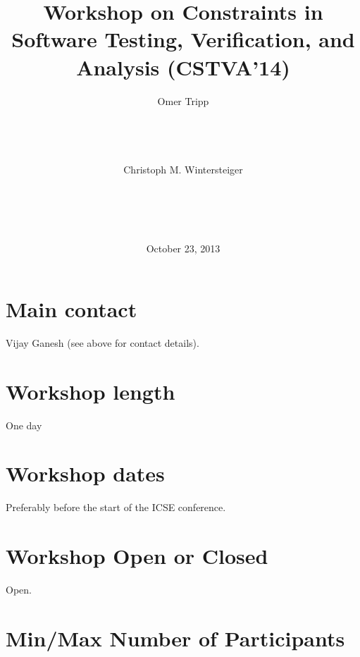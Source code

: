 \documentclass{sig-alternate}
\begin{document}
\title{Workshop on Constraints in Software Testing, Verification, and
  Analysis (CSTVA'14)}


\author{
\alignauthor
Omer Tripp\\
       \\
       \\
       \\
       \\
\alignauthor
Christoph M. Wintersteiger\\
       \\
       \\
       \\
       \\
}
\date{October 23, 2013}

\maketitle
\toappear{}

\section{Main contact}
\vspace{0.2cm}
Vijay Ganesh (see above for contact details).

\section{Workshop length}
\vspace{0.2cm}
One day

\section{Workshop dates}
\vspace{0.2cm}
Preferably before the start of the ICSE conference.

\section{Workshop Open or Closed}
\vspace{0.2cm}
Open.

\section{Min/Max Number of Participants}
\vspace{0.2cm} 
\end{document}
